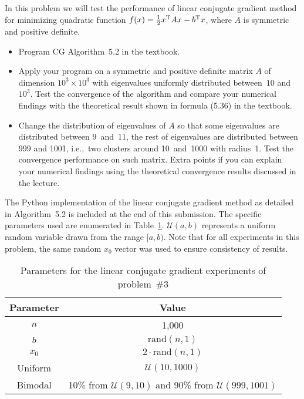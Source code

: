 \begin{problem}
  In this problem we will test the performance of linear conjugate gradient method for minimizing quadratic function $f(x) = \frac{1}{2}x^{\textnormal{T}} Ax - b ^{\textnormal{T}} x$, where $A$ is symmetric and positive definite.

  \begin{itemize}
    \item Program CG Algorithm~5.2 in the textbook.

    \item Apply your program on a symmetric and positive definite matrix $A$ of dimension $10^{3} \times 10^{3}$ with eigenvalues uniformly distributed between~$10$ and~$10^3$. Test the convergence of the algorithm and compare your numerical findings with the theoretical result shown in formula (5.36) in the textbook.

    \item Change the distribution of eigenvalues of $A$ so that some eigenvalues are distributed between 9~and~11, the rest of eigenvalues are distributed between 999 and 1001, i.e.,~two clusters around 10~and~1000 with radius~1. Test the convergence performance on such matrix. Extra points if you can explain your numerical findings using the theoretical convergence results discussed in the lecture.
  \end{itemize}
\end{problem}

The Python implementation of the linear conjugate gradient method as detailed in Algorithm~5.2 is included at the end of this submission.  The specific parameters used are enumerated in Table~\ref{tab:p03:ExperimentParams}.  $\mathcal{U}(a,b)$ represents a uniform random variable drawn from the range $[a,b)$.  Note that for all experiments in this problem, the same random $x_0$ vector was used to ensure consistency of results.

\begin{table}[h]
  \centering
  \caption{Parameters for the linear conjugate gradient experiments of problem~\#3}\label{tab:p03:ExperimentParams}
  \begin{tabular}{|c|c|}
    \hline
    \textbf{Parameter} & \textbf{Value} \\
    \hline\hline
    $n$     & 1,000 \\ \hline
    $b$     & $\text{rand}(n,1)$ \\ \hline
    $x_0$   & $2\cdot\text{rand}(n,1)$ \\ \hline
    Uniform & $\mathcal{U}(10,1000)$ \\ \hline
    Bimodal & 10\% from $\mathcal{U}(9,10)$ and 90\% from $\mathcal{U}(999,1001)$\\ \hline
  \end{tabular}
\end{table}

